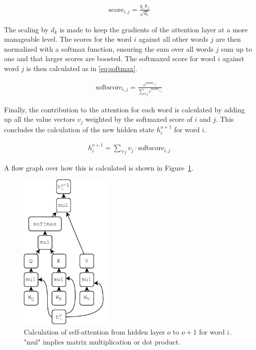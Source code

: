 \begin{align}
    \text{score}_{i,j} = \frac{q_i \boldsymbol{\cdot} k_j}{\sqrt{d_k}}
\end{align}

The scaling by $d_k$ is made to keep the gradients of the attention layer at a more manageable level. The scores for the word $i$ against all other words $j$ are then normalized with a softmax function, ensuring the sum over all words $j$ sum up to one and that larger scores are boosted. The softmaxed score for word $i$ against word $j$ is then calculated as in \ref{eq:softmax}.

\begin{align}
    \text{softscore}_{i,j} = \frac{e^{\text{score}_{i,j}}}{\sum\limits_{\forall j} e^{\text{score}_{i,j}}}
    \label{eq:softmax}
\end{align}

Finally, the contribution to the attention for each word is calculated by adding up all the value vectors $v_j$ weighted by the softmaxed score of $i$ and $j$. This concludes the calculation of the new hidden state $h_i^{o+1}$ for word $i$. 

\begin{align}
    h_i^{o+1} = \sum\limits_{\forall j} v_j \cdot  \text{softscore}_{i,j} 
\end{align}

A flow graph over how this is calculated is shown in Figure~\ref{fig:attflow}. 

\begin{figure}[H]
    \centering
    \includegraphics[width=0.4\textwidth]{Figures/figs-self-att.pdf}
    \caption{Calculation of self-attention from hidden layer $o$ to $o+1$ for word $i$. "mul" implies matrix multiplication or dot product. }
    \label{fig:attflow}
\end{figure}

